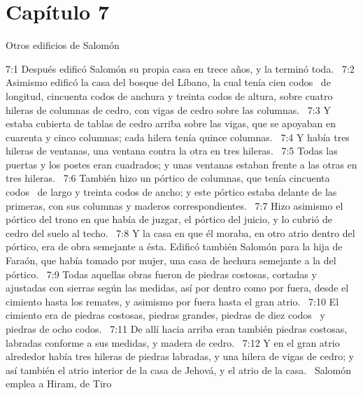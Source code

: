 \section*{Capítulo 7}
Otros edificios de Salomón  

7:1 Después edificó Salomón su propia casa en trece años, y la terminó toda.  
7:2 Asimismo edificó la casa del bosque del Líbano, la cual tenía cien codos  de longitud, cincuenta codos de anchura y treinta codos de altura, sobre cuatro hileras de columnas de cedro, con vigas de cedro sobre las columnas.  
7:3 Y estaba cubierta de tablas de cedro arriba sobre las vigas, que se apoyaban en cuarenta y cinco columnas; cada hilera tenía quince columnas.  
7:4 Y había tres hileras de ventanas, una ventana contra la otra en tres hileras.  
7:5 Todas las puertas y los postes eran cuadrados; y unas ventanas estaban frente a las otras en tres hileras.  
7:6 También hizo un pórtico de columnas, que tenía cincuenta codos  de largo y treinta codos de ancho; y este pórtico estaba delante de las primeras, con sus columnas y maderos correspondientes.  
7:7 Hizo asimismo el pórtico del trono en que había de juzgar, el pórtico del juicio, y lo cubrió de cedro del suelo al techo.  
7:8 Y la casa en que él moraba, en otro atrio dentro del pórtico, era de obra semejante a ésta. Edificó también Salomón para la hija de Faraón, que había tomado por mujer, una casa de hechura semejante a la del pórtico.  
7:9 Todas aquellas obras fueron de piedras costosas, cortadas y ajustadas con sierras según las medidas, así por dentro como por fuera, desde el cimiento hasta los remates, y asimismo por fuera hasta el gran atrio.  
7:10 El cimiento era de piedras costosas, piedras grandes, piedras de diez codos  y piedras de ocho codos.  
7:11 De allí hacia arriba eran también piedras costosas, labradas conforme a sus medidas, y madera de cedro.  
7:12 Y en el gran atrio alrededor había tres hileras de piedras labradas, y una hilera de vigas de cedro; y así también el atrio interior de la casa de Jehová, y el atrio de la casa.  
Salomón emplea a Hiram, de Tiro  

